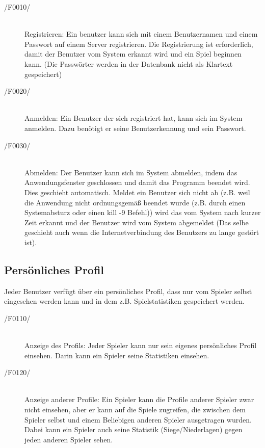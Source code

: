 \begin{description}
	\item[/F0010/]~\\
		Registrieren: Ein benutzer kann sich mit einem Benutzernamen und einem Passwort auf einem Server registrieren. Die Registrierung ist erforderlich, damit der Benutzer vom System erkannt wird und ein Spiel beginnen kann. (Die Passwörter werden in der Datenbank nicht als Klartext gespeichert)
	\item[/F0020/]~\\
		Anmelden: Ein Benutzer der sich registriert hat, kann sich im System anmelden. Dazu benötigt er seine Benutzerkennung und sein Passwort.
	\item[/F0030/]~\\
		Abmelden: Der Benutzer kann sich im System abmelden, indem das Anwendungsfenster geschlossen und damit das Programm beendet wird. Dies geschieht automatisch. Meldet ein Benutzer sich nicht ab (z.B. weil die Anwendung nicht ordnungsgemäß beendet wurde (z.B. durch einen Systemabsturz oder einen kill -9 Befehl)) wird das vom System nach kurzer Zeit erkannt und der Benutzer wird vom System abgemeldet (Das selbe geschieht auch wenn die Internetverbindung des Benutzers zu lange gestört ist).
\end{description}


\subsection{Persönliches Profil}

Jeder Benutzer verfügt über ein persönliches Profil, dass nur vom Spieler selbst eingesehen werden kann und in dem z.B. Spielstatistiken gespeichert werden.

\begin{description}
	\item[/F0110/]~\\
		Anzeige des Profils: Jeder Spieler kann nur sein eigenes persönliches Profil einsehen. Darin kann ein Spieler seine Statistiken einsehen.
	\item[/F0120/]~\\
		Anzeige anderer Profile: Ein Spieler kann die Profile anderer Spieler zwar nicht einsehen, aber er kann auf die Spiele zugreifen, die zwischen dem Spieler selbst und einem Beliebigen anderen Spieler ausgetragen wurden. Dabei kann ein Spieler auch seine Statistik (Siege/Niederlagen) gegen jeden anderen Spieler sehen.
\end{description}


